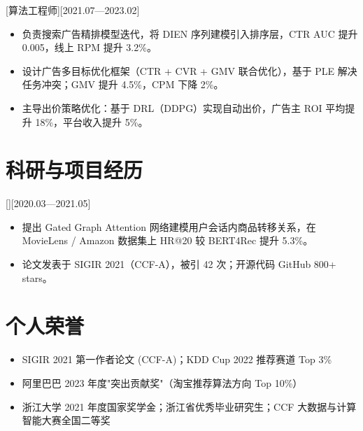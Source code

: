 \documentclass{resume-photo}
\begin{document}
[\textnormal{算法工程师}][2021.07—2023.02]
\begin{itemize}
  \item 负责搜索广告精排模型迭代，将 DIEN 序列建模引入排序层，CTR AUC 提升 0.005，线上 RPM 提升 3.2\%。
  \item 设计广告多目标优化框架（CTR + CVR + GMV 联合优化），基于 PLE 解决任务冲突；GMV 提升 4.5\%，CPM 下降 2\%。
  \item 主导出价策略优化：基于 DRL（DDPG）实现自动出价，广告主 ROI 平均提升 18\%，平台收入提升 5\%。
\end{itemize}

\section{科研与项目经历}

[][2020.03—2021.05]
\begin{itemize}
  \item 提出 Gated Graph Attention 网络建模用户会话内商品转移关系，在 MovieLens / Amazon 数据集上 HR@20 较 BERT4Rec 提升 5.3\%。
  \item 论文发表于 SIGIR 2021（CCF-A），被引 42 次；开源代码 GitHub 800+ stars。
\end{itemize}

\section{个人荣誉}
\begin{itemize}
  \item SIGIR 2021 第一作者论文 (CCF-A)；KDD Cup 2022 推荐赛道 Top 3\%
  \item 阿里巴巴 2023 年度"突出贡献奖"（淘宝推荐算法方向 Top 10\%）
  \item 浙江大学 2021 年度国家奖学金；浙江省优秀毕业研究生；CCF 大数据与计算智能大赛全国二等奖
\end{itemize}
\end{document}

